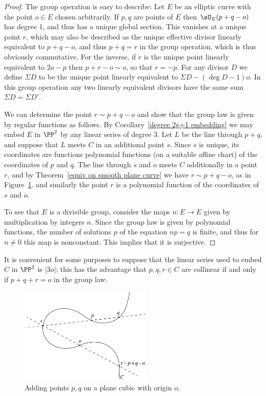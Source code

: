 \begin{proof}
 The group operation is easy to describe:
Let $E$ be an elliptic curve with the point $o\in E$ chosen arbitrarily. If $p,q$ are points of $E$ then $\sO_E(p+q-o)$ has degree 1, and
thus has a unique global section. This vanishes at a unique point $r$, which may also be described as the unique
effective divisor linearly equivalent to $p+q-o$, and thus
$p+q = r$ in the group operation, which is thus obviously commutative. For the inverse, if $r$ is the  unique point
linearly equivalent to $2o-p$ then $p+r-o\sim o$, so that $r=-p$. For any divisor $D$
we define
%
$\Sigma D$
to be the unique point linearly equivalent to $\Sigma D-(\deg D-1)o$.
In this group operation any two linearly
equivalent divisors have the same sum $\Sigma D = \Sigma D'$.

We can determine the point $r\sim p+q-o$ and show that the group law
is given by
regular functions
%
as follows. By Corollary~\ref{degree 2g+1 embedding} we may embed $E$ in $\PP^2$ by any linear series
of degree 3.  Let $L$ be the line through $p+q$, and suppose that
$L$ meets $C$ in an additional point $s$. Since $s$ is unique, its coordinates are functions
polynomial functions
%
(on a suitable affine chart) of the coordinates of $p$ and $q$. The line through $s$ and $o$ meets $C$ additionally in a point $r$,
and by Theorem~\ref{equiv on smooth plane curve} we have $r\sim p+q-o$, as in Figure~\ref{group law on cubic}.
and similarly the point $r$ is a polynomial function of the coordinates of $s$ and $o$.

To see that $E$ is a divisible group, consider the maps $n: E\to E$ given by multiplication by integers $n$. Since the
group law is given by polynomial functions, the number of solutions $p$ of the equation $np = q$ is finite, and thus
for $n\neq 0$ this map is nonconstant. This implies that it is surjective.
\end{proof}

It is convenient for some purposes to suppose that the linear series used to embed $C$ in $\PP^2$ is $|3o|$; this
has the advantage that $p,q,r\in C$ are collinear if and only if $p+q+r =o$ in the group law.

\begin{figure}
\centerline {\includegraphics[height=1.8in]{"main/Fig03-2"}}
\vskip-6pt
 \caption{Adding points $p, q$ on a plane cubic with origin $o$.}
\label{group law on cubic}
\end{figure}

